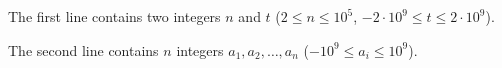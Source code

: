 The first line contains two integers $n$ and $t$ ($2 \le n \le 10^5$, $-2 \cdot 10^9 \le t \le 2 \cdot 10^9$).

The second line contains $n$ integers $a_1, a_2, \ldots, a_n$ ($-10^9 \le a_i \le 10^9$).
